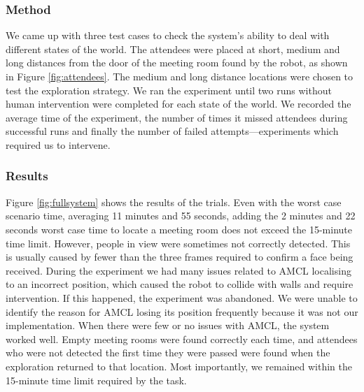 \documentclass[conference]{IEEEtran}
\begin{document}
\subsubsection{Method}
We came up with three test cases to check the system's ability to deal with different states of the world. The attendees were placed at short, medium and long distances from the door of the meeting room found by the robot, as shown in Figure \ref{fig:attendees}. The medium and long distance locations were chosen to test the exploration strategy. We ran the experiment until two runs without human intervention were completed for each state of the world. We recorded the average time of the experiment, the number of times it missed attendees during successful runs and finally the number of failed attempts---experiments which required us to intervene.
\subsubsection{Results}
\label{sec:attendres}
Figure \ref{fig:fullsystem} shows the results of the trials. Even with the worst case scenario time, averaging 11 minutes and 55 seconds, adding the 2 minutes and 22 seconds worst case time to locate a meeting room does not exceed the 15-minute time limit. However, people in view were sometimes not correctly detected. This is usually caused by fewer than the three frames required to confirm a face being received. During the experiment we had many issues related to AMCL localising to an incorrect position, which caused the robot to collide with walls and require intervention. If this happened, the experiment was abandoned. We were unable to identify the reason for AMCL losing its position frequently because it was not our implementation. When there were few or no issues with AMCL, the system worked well. Empty meeting rooms were found correctly each time, and attendees who were not detected the first time they were passed were found when the exploration returned to that location. Most importantly, we remained within the 15-minute time limit required by the task.
\end{document}
